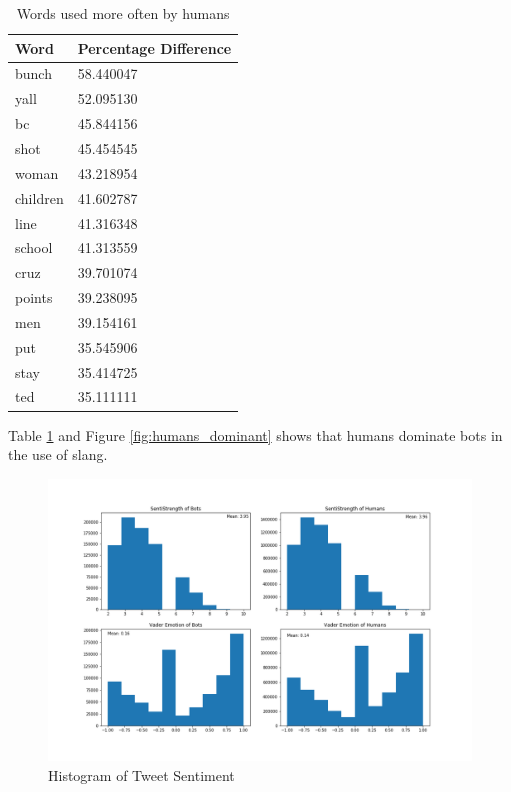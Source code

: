 \documentclass[letterpaper]{article}
\begin{document}
\begin{table}
    \centering
    \begin{tabular}{|l|l|}
    \hline
    \textbf{Word} & \textbf{Percentage Difference} \\ \hline
    bunch & 58.440047 \\ \hline
    yall & 52.095130 \\ \hline
    bc & 45.844156 \\ \hline
    shot & 45.454545 \\ \hline
    woman & 43.218954 \\ \hline
    children & 41.602787 \\ \hline
    line & 41.316348 \\ \hline
    school & 41.313559 \\ \hline
    cruz & 39.701074 \\ \hline
    points & 39.238095 \\ \hline
    men & 39.154161 \\ \hline
    put & 35.545906 \\ \hline
    stay & 35.414725 \\ \hline
    ted & 35.111111 \\ \hline
    \end{tabular}
    \caption{Words used more often by humans}
    \label{tab:humans-dominant-words}
\end{table}

Table \ref{tab:humans-dominant-words} and Figure \ref{fig:humans_dominant} shows that humans dominate bots in the use of slang. \par

\begin{figure}
    \includegraphics[width=\linewidth]{images/emotions.png}
    \caption{Histogram of Tweet Sentiment}
    \label{fig:setiment_histogram}
\end{figure}
\end{document}
